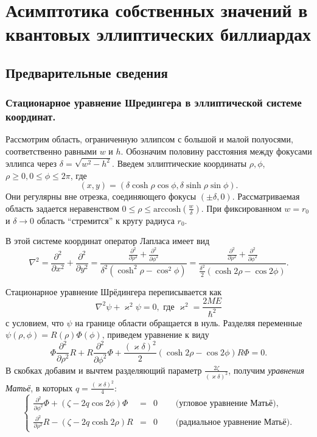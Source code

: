 \chapter{Асимптотика собственных значений в квантовых эллиптических биллиардах}\label{ch:ch2}

\section{Предварительные сведения}\label{sec:ch2/sec1}
\subsection{Стационарное уравнение Шредингера в эллиптической системе координат.}\label{sec:ch2/sec1/subs1}

Рассмотрим область, ограниченную эллипсом с большой и малой полуосями, соответственно равными $w$ и $h$.
Обозначим половину расстояния между фокусами эллипса через  $\delta = \sqrt{w^2 - h^2}$.
Введем эллиптические координаты $\rho, \phi$, $\rho\ge 0, 0\le\phi \le 2\pi$, где 
$$(x, y) = (\delta\cosh{\rho}\cos{\phi}, \delta\sinh{\rho}\sin{\phi}). $$
Они регулярны вне отрезка, соединяющего фокусы $(\pm\delta,0)$.
 Рассматриваемая область задается неравенством $0 \leq \rho \leq \text{arccosh} (\frac{w}{\delta})$. 
При фиксированном $w=r_0$ и  $\delta\to 0$
область ``стремится'' к кругу радиуса $r_0$.
 
 В этой системе координат оператор Лапласа имеет вид
$$\nabla^2 = \frac{\partial^2}{\partial x^2} + \frac{\partial^2}{\partial y^2} = \frac{\frac{\partial^2}{\partial \rho^2} + \frac{\partial^2}{\partial \phi^2}}{\delta^2(\cosh^2{\rho} - \cos^2{\phi})} = 
\frac{\frac{\partial^2}{\partial \rho^2} + \frac{\partial^2}{\partial \phi^2}}{\frac{\delta^2}{2}(\cosh{2\rho} - \cos{2\phi})}.$$

 
Стационарное уравнение Шрёдингера 
переписывается как
$$ \nabla^2 \psi +\varkappa^2\psi =  0, \text{  где  }\varkappa^2 =\frac{2ME}{\hbar^2}$$
с условием, что $\psi$ на границе области обращается в нуль.
Разделяя переменные $\psi(\rho,\phi) = R(\rho)\Phi(\phi)$, приведем уравнение к виду
$$\Phi\frac{\partial^2}{\partial \rho^2}R + R\frac{\partial^2}{\partial \phi^2}\Phi + \frac{(\varkappa \delta)^2}{2}(\cosh{2\rho} - \cos{2\phi})R\Phi = 0. $$
В скобках добавим и вычтем разделяющий параметр $\frac{2\zeta}{(\varkappa \delta)^2}$, получим \textit{уравнения Матьё}, в которых $q=\frac{(\varkappa \delta)^2}{4}$:
\begin{equation}
\left\{
\begin{array}{rcll}

			\frac{\partial^2}{\partial \phi^2}\Phi + (\zeta - 2q\cos{2\phi})\Phi &= &0 \quad 	 &\textit{   (угловое уравнение Матьё)}, \\
		\frac{\partial^2}{\partial \rho^2}R - (\zeta - 2q\cosh{2\rho})R &=& 0 	\quad	& \textit{   (радиальное уравнение Матьё)}.  
\end{array}
\right.
\label{eq:mathieusystem}
\end{equation}


